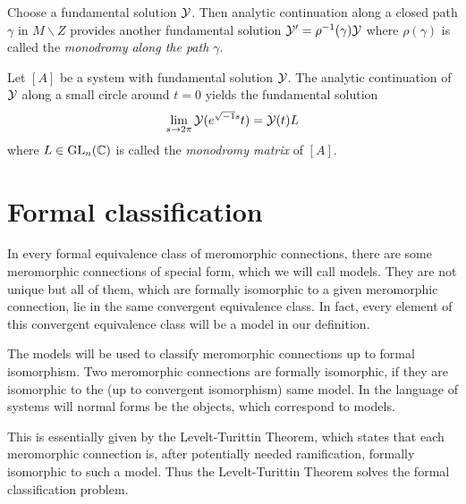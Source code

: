 Choose a fundamental solution $\mathcal{Y}$. Then analytic continuation along a closed
path $\gamma$ in $M\backslash Z$ provides another fundamental solution
$\mathcal{Y}'=\rho^{-1}(\gamma)\mathcal{Y}$ where $\rho(\gamma)$ is called the \emph{monodromy
along the path $\gamma$}.
\begin{defn}
  Let $[A]$ be a system with fundamental solution $\mathcal{Y}$.
  The analytic continuation of $\mathcal{Y}$ along a small circle around $t=0$ yields
  the fundamental solution
  \[
    \lim_{s\to2\pi}\mathcal{Y}(e^{\sqrt{-1}s}t)=\mathcal{Y}(t)L
  \]
  where $L\in\operatorname{GL}_n(\mathbb{C})$ is called the \emph{\TODO[(formal)?]monodromy matrix}
  of $[A]$.
\end{defn}

\section{Formal classification}\label{sec:formalClassification}
In every formal equivalence class of meromorphic connections, there are some
meromorphic connections of special form, which we will call models. They are
not unique but all of them, which are formally isomorphic to a given
meromorphic connection, lie in the same convergent equivalence class.
In fact, every element of this convergent equivalence class will be a model in
our definition.

The models will be used to classify meromorphic connections up to formal
isomorphism. Two meromorphic connections are formally isomorphic, if they are
isomorphic to the (up to convergent isomorphism) same model. In the language of
systems will normal forms be the objects, which correspond to models.

This is essentially given by the Levelt-Turittin Theorem, which states that each
meromorphic connection is, after potentially needed ramification, formally
isomorphic to such a model. Thus the Levelt-Turittin Theorem solves the formal
classification problem.

